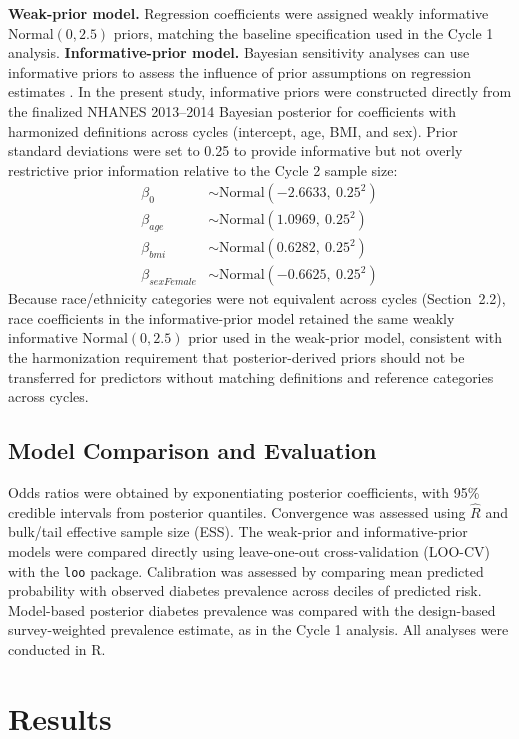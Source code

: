 \documentclass[11pt]{article}
\begin{document}
\textbf{Weak-prior model.} Regression coefficients were assigned weakly
informative Normal$(0,2.5)$ priors, matching the baseline specification used
in the Cycle 1 analysis.
\textbf{Informative-prior model.} Bayesian sensitivity analyses can use
informative priors to assess the influence of prior assumptions on
regression estimates \cite{Luta2013Bayesian}. In the present study,
informative priors were constructed directly from the finalized
NHANES 2013--2014 Bayesian posterior for coefficients with harmonized
definitions across cycles (intercept, age, BMI, and sex). Prior standard
deviations were set to 0.25 to provide informative but not overly
restrictive prior information relative to the Cycle 2 sample size:
\begin{align}
\beta_0 &\sim \text{Normal}(-2.6633,\ 0.25^2) \\
\beta_{age} &\sim \text{Normal}(1.0969,\ 0.25^2) \\
\beta_{bmi} &\sim \text{Normal}(0.6282,\ 0.25^2) \\
\beta_{sexFemale} &\sim \text{Normal}(-0.6625,\ 0.25^2)
\end{align}
Because race/ethnicity categories were not equivalent across cycles
(Section~2.2), race coefficients in the informative-prior model retained the
same weakly informative Normal$(0,2.5)$ prior used in the weak-prior model,
consistent with the harmonization requirement that posterior-derived priors
should not be transferred for predictors without matching definitions and
reference categories across cycles.

\subsection{Model Comparison and Evaluation}
Odds ratios were obtained by exponentiating posterior coefficients, with
95\% credible intervals from posterior quantiles. Convergence was assessed
using $\hat{R}$ and bulk/tail effective sample size (ESS). The weak-prior and
informative-prior models were compared directly using leave-one-out
cross-validation (LOO-CV) with the \texttt{loo} package. Calibration was
assessed by comparing mean predicted probability with observed diabetes
prevalence across deciles of predicted risk. Model-based posterior diabetes
prevalence was compared with the design-based survey-weighted prevalence
estimate, as in the Cycle 1 analysis. All analyses were conducted in R.

\section{Results}
\end{document}
